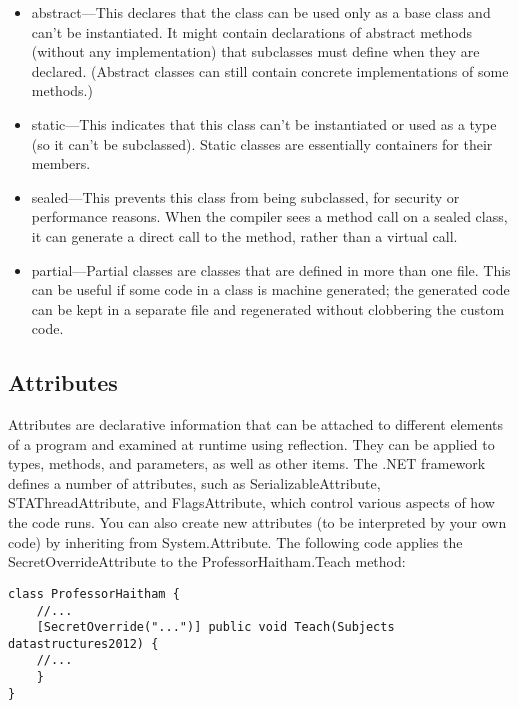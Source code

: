 \documentclass[12pt,a4paper,final,twoside,onecolumn,titlepage]{book}
\begin{document}
\begin{itemize}
\item abstract—This declares that the class can be used only as a base class and can’t be instantiated. It might contain declarations of abstract methods (without any implementation) that subclasses must define when they are declared. (Abstract classes can still contain concrete implementations of some methods.)
\item static—This indicates that this class can’t be instantiated or used as a type (so it can’t be subclassed). Static classes are essentially containers for their members.
\item sealed—This prevents this class from being subclassed, for security or performance reasons. When the compiler sees a method call on a sealed class, it can generate a direct call to the method, rather than a virtual call.
\item partial—Partial classes are classes that are defined in more than one file. This can be useful if some code in a class is machine generated; the generated code can be kept in a separate file and regenerated without clobbering the custom code.
\end{itemize}
\subsection{Attributes}
Attributes are declarative information that can be attached to different elements of a program and examined at runtime using reflection. They can be applied to types, methods, and parameters, as well as other items. The .NET framework defines a number of attributes, such as SerializableAttribute, STAThreadAttribute, and FlagsAttribute, which control various aspects of how the code runs. You can also create new attributes (to be interpreted by your own code) by inheriting from System.Attribute.
The following code applies the SecretOverrideAttribute to the ProfessorHaitham.Teach method:
\lstset{language=csh, tabsize=4}
\begin{center}
 \begin{lstlisting}
class ProfessorHaitham { 
	//...
	[SecretOverride("...")] public void Teach(Subjects datastructures2012) {
	//...
	}
}
 \end{lstlisting}
\end{center}
\end{document}
